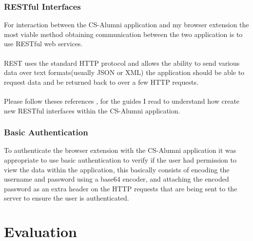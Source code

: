 \documentclass{article}
\begin{document}
\subsubsection{RESTful Interfaces}
\label{sec:technology}

For interaction between the CS-Alumni application and my browser extension the most viable method obtaining communication between the two application is to use RESTful web services.\\
\\
REST uses the standard HTTP protocol and allows the ability to send various data over text formats(usually JSON or XML) the application should be able to request data and be returned back to over a few HTTP requests. \\
\\
Please follow theses references \cite[see reference][page \pageref{LastPage}]{bara:2013:online}, \cite[see reference][page \pageref{LastPage}]{saa:2013:online} for the guides I read to understand how create new RESTful interfaces within the CS-Alumni application.

\subsubsection{Basic Authentication}


To authenticate the browser extension with the CS-Alumni application it was appropriate to use basic authentication to verify if the user had permission to view the data within the application, this basically consists of encoding the username and password using a base64 encoder, and attaching the encoded password as an extra header on the HTTP requests that are being sent to the server to ensure the user is authenticated. \cite[see reference][page \pageref{LastPage}]{wp:2014:online}

\newpage
\section{Evaluation}
\end{document}
